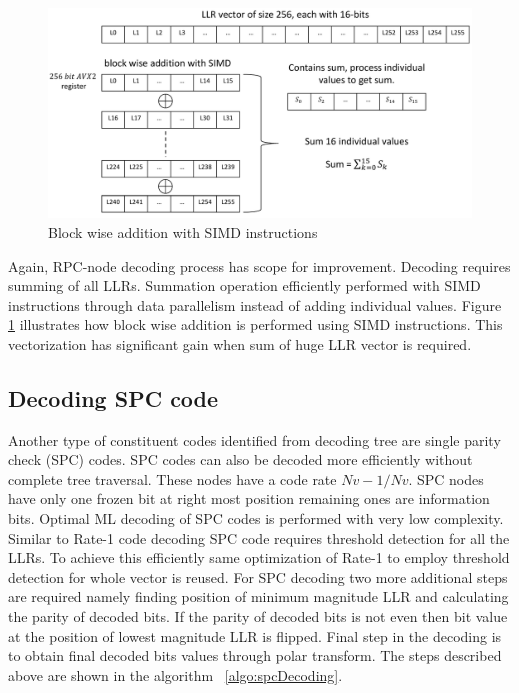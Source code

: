 \begin{figure}[]
	\centering
	\includegraphics[width=1.0\textwidth]{./figures/SIMD_Addition.pdf}
	\caption{Block wise addition with SIMD instructions}
	\label{fig:SIMDAddition}
\end{figure}

Again, RPC-node decoding process has scope for improvement. Decoding requires summing of all LLRs. Summation operation efficiently performed with SIMD instructions through data parallelism instead of adding individual values. Figure \ref{fig:SIMDAddition} illustrates how block wise addition is performed using SIMD instructions. This vectorization has significant gain when sum of huge LLR vector is required.

\subsection{Decoding SPC code}
Another type of constituent codes identified from decoding tree are single parity check (SPC) codes. SPC codes can also be decoded more efficiently without complete tree traversal. These nodes have a code rate $Nv-1/Nv$. SPC nodes have only one frozen bit at right most position remaining ones are information bits. Optimal ML decoding of SPC codes is performed with very low complexity. Similar to Rate-1 code decoding SPC code requires threshold detection for all the LLRs. To achieve this efficiently same optimization of Rate-1 to employ threshold detection for whole vector is reused. For SPC decoding two more additional steps are required namely finding position of minimum magnitude LLR and calculating the parity of decoded bits. If the parity of decoded bits is not even then bit value at the position of lowest magnitude LLR is flipped. Final step in the decoding is to obtain final decoded bits values through polar transform. The steps described above are shown in the algorithm ~\ref{algo:spcDecoding}.


